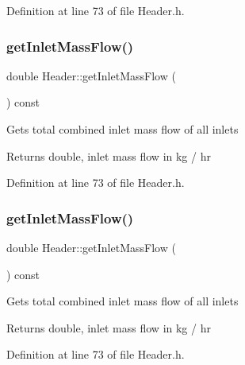 Definition at line 73 of file Header.\+h.

\mbox{\label{class_header_ad572e6144481b9e9f65004aacebd701c}} 
\subsubsection{\texorpdfstring{get\+Inlet\+Mass\+Flow()}{getInletMassFlow()}\hspace{0.1cm}{\footnotesize\ttfamily [2/3]}}
{\footnotesize\ttfamily double Header\+::get\+Inlet\+Mass\+Flow (\begin{DoxyParamCaption}{ }\end{DoxyParamCaption}) const\hspace{0.3cm}{\ttfamily [inline]}}

Gets total combined inlet mass flow of all inlets \begin{DoxyReturn}{Returns}
double, inlet mass flow in kg / hr 
\end{DoxyReturn}


Definition at line 73 of file Header.\+h.

\mbox{\label{class_header_ad572e6144481b9e9f65004aacebd701c}} 
\subsubsection{\texorpdfstring{get\+Inlet\+Mass\+Flow()}{getInletMassFlow()}\hspace{0.1cm}{\footnotesize\ttfamily [3/3]}}
{\footnotesize\ttfamily double Header\+::get\+Inlet\+Mass\+Flow (\begin{DoxyParamCaption}{ }\end{DoxyParamCaption}) const\hspace{0.3cm}{\ttfamily [inline]}}

Gets total combined inlet mass flow of all inlets \begin{DoxyReturn}{Returns}
double, inlet mass flow in kg / hr 
\end{DoxyReturn}


Definition at line 73 of file Header.\+h.

\mbox{\label{class_header_a625d7317488c88c949acd05c72a7c54a}} 
